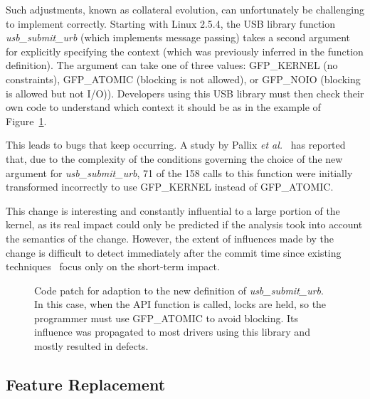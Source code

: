 Such adjustments,
known as collateral evolution, can unfortunately be challenging to implement
correctly. Starting with Linux 2.5.4, the USB library function {\em
usb\_submit\_urb} (which implements message passing) takes a second argument for
explicitly specifying the context (which was previously inferred in the
function definition). The argument can take one of three values: GFP\_KERNEL (no
constraints), GFP\_ATOMIC (blocking is not allowed), or GFP\_NOIO (blocking is
allowed but not I/O)). Developers using this USB library must then check their
own code to understand which context it should be as in the example of Figure~\ref{listing:usb}.

This leads to bugs that keep occurring.
A study by Pallix {\em et al.}~\cite{Palix10Faults} has reported that, due to
the complexity of the conditions governing the choice of the new argument for
{\em usb\_submit\_urb}, 71 of the 158 calls to this function were initially
transformed incorrectly to use GFP\_KERNEL instead of GFP\_ATOMIC.


This change is interesting and constantly influential to a large portion of the
kernel, as its real impact could only be predicted if the analysis took into
account the semantics of the change. However, the extent of influences made by
the change is difficult to detect immediately after
the commit time since existing
techniques~\cite{ren_chianti:_2004,zhang_faulttracer:_2012,robillard_retrieving_2008,sherriff_empirical_2008}
focus only on the short-term impact.


\begin{figure}[!ht]
\centering
{\parbox{\linewidth}{

}}%
\caption{Code patch for adaption to the new definition of {\em usb\_submit\_urb}.
    In this case, when the API function is called, locks are held, so the programmer must use
    GFP\_ATOMIC to avoid blocking. Its influence was propagated to most
    drivers using this library and mostly resulted in defects.}
\label{listing:usb}
\end{figure}


\subsection{Feature Replacement}
\label{sec:motivation2}

